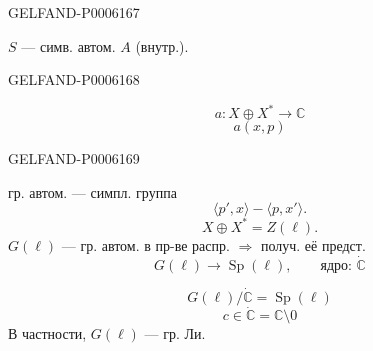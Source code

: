 \begin{GelfandAdjacentEvidence}{GELFAND-P000616}{7}


\(S\) — симв. автом. \(A\) (внутр.).
\end{GelfandAdjacentEvidence}
\begin{GelfandAdjacentEvidence}{GELFAND-P000616}{8}


\[
a:X\oplus X^*\longrightarrow\mathbb C
\]
\[
a(x,p)
\]
\end{GelfandAdjacentEvidence}
\begin{GelfandAdjacentEvidence}{GELFAND-P000616}{9}

гр. автом. — симпл. группа
\[
\langle p',x\rangle-\langle p,x'\rangle.
\]
\[
X\oplus X^*=Z(\ell).
\]
\(G(\ell)\) — гр. автом. в пр-ве распр. \(\Rightarrow\) получ. её предст.
\[
G(\ell)\longrightarrow\operatorname{Sp}(\ell),\qquad
\text{ядро: }\dot{\mathbb C}
\]
\end{GelfandAdjacentEvidence}

\[
G(\ell)/\dot{\mathbb C}=\operatorname{Sp}(\ell)
\]
\[
c\in\dot{\mathbb C}=\mathbb C\setminus0
\]
В частности, \(G(\ell)\) — гр. Ли.


